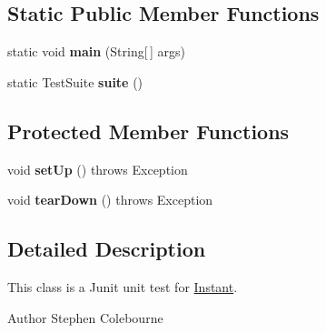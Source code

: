 \subsection*{Static Public Member Functions}
\begin{DoxyCompactItemize}
\item 
\hypertarget{classorg_1_1joda_1_1time_1_1_test_instant___constructors_a6c646a071f85ab2746e54a8ed807ab85}{static void {\bfseries main} (String\mbox{[}$\,$\mbox{]} args)}\label{classorg_1_1joda_1_1time_1_1_test_instant___constructors_a6c646a071f85ab2746e54a8ed807ab85}

\item 
\hypertarget{classorg_1_1joda_1_1time_1_1_test_instant___constructors_ad72a237cce590b8c18906527e938de17}{static Test\-Suite {\bfseries suite} ()}\label{classorg_1_1joda_1_1time_1_1_test_instant___constructors_ad72a237cce590b8c18906527e938de17}

\end{DoxyCompactItemize}
\subsection*{Protected Member Functions}
\begin{DoxyCompactItemize}
\item 
\hypertarget{classorg_1_1joda_1_1time_1_1_test_instant___constructors_ac940a2e6d627d61855c4c09d12079850}{void {\bfseries set\-Up} ()  throws Exception }\label{classorg_1_1joda_1_1time_1_1_test_instant___constructors_ac940a2e6d627d61855c4c09d12079850}

\item 
\hypertarget{classorg_1_1joda_1_1time_1_1_test_instant___constructors_af9bea34e6e4cdaf43eac346a54b998f9}{void {\bfseries tear\-Down} ()  throws Exception }\label{classorg_1_1joda_1_1time_1_1_test_instant___constructors_af9bea34e6e4cdaf43eac346a54b998f9}

\end{DoxyCompactItemize}


\subsection{Detailed Description}
This class is a Junit unit test for \hyperlink{classorg_1_1joda_1_1time_1_1_instant}{Instant}.

\begin{DoxyAuthor}{Author}
Stephen Colebourne 
\end{DoxyAuthor}


